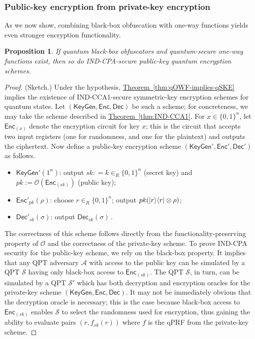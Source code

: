 \documentclass[11pt]{article}
\numberwithin{equation}{section}
\newtheorem{prop}{Proposition}
\newcommand{\expref}[2]{\texorpdfstring{\hyperref[#2]{#1~\ref{#2}}}{#1~\ref{#2}}}
\newcommand{\algo}{\mathcal}
\newcommand{\KeyGen}{\ensuremath{\mathsf{KeyGen}}\xspace}
\newcommand{\Enc}{\ensuremath{\mathsf{Enc}}\xspace}
\newcommand{\Dec}{\ensuremath{\mathsf{Dec}}\xspace}
\newcommand{\inrand}{\in_R}
\begin{document}
{\subsubsection{Public-key encryption from private-key encryption}

As we now show, combining black-box obfuscation with one-way functions yields even stronger encryption functionality.

\begin{prop}\label{prop:PKE}
If quantum black-box obfuscators and quantum-secure one-way functions exist, then so do IND-CPA-secure public-key quantum encryption schemes.
\end{prop}
\begin{proof} (Sketch.)
Under the hypothesis, \expref{Theorem}{thm:qOWF-implies-qSKE} implies the existence of IND-CCA1-secure symmetric-key encryption schemes for quantum states. Let $(\KeyGen, \Enc, \Dec)$ be such a scheme; for concreteness, we may take the scheme described in \expref{Theorem}{thm:IND-CCA1}. For $x \in \{0, 1\}^n$, let $\Enc_{(x)}$ denote the encryption circuit for key $x$; this is the circuit that accepts two input registers (one for randomness, and one for the plaintext) and outputs the ciphertext. Now define a public-key encryption scheme $(\KeyGen', \Enc', \Dec')$ as follows.
\begin{itemize}
\item $\KeyGen'(1^n)$: output $sk : = k \inrand \{0, 1\}^n$ (secret key) and $pk := \algo O\left(\Enc_{(sk)}\right)$ (public key);
\item $\Enc'_{pk}(\rho)$: choose $r \inrand \{0, 1\}^n$; output $pk( {\left\vert{r}\right\rangle}{\left\langle{r}\right\vert} \otimes \rho)$;
\item $\Dec'_{sk}(\sigma)$: output  $\Dec_{sk}(\sigma)$\,.
\end{itemize}
The correctness of this scheme follows directly from the functionality-preserving property of $\algo O$ and the correctness of the private-key scheme. To prove IND-CPA security for the public-key scheme, we rely on the black-box property. It implies that any QPT adversary $\algo A$ with access to the public key can be simulated by a QPT $\algo S$ having only black-box access to $\Enc_{(sk)}$. The QPT $\algo S$, in turn, can be simulated by a QPT $\algo S'$ which has both decryption and encryption oracles for the private-key scheme $(\KeyGen, \Enc, \Dec)$. It may not be immediately obvious that the decryption oracle is necessary; this is the case because black-box access to $\Enc_{(sk)}$ enables $\algo S$ to select the randomness used for encryption, thus gaining the ability to evaluate pairs $(r, f_{sk}(r))$ where $f$ is the qPRF from the private-key scheme. 


\end{proof}}
\end{document}

